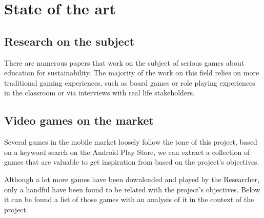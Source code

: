 \chapter{State of the art}

\section{Research on the subject}

There are numerous papers 
\cite{gamingnaturalresource}
\cite{roleplayingasatool}
\cite{usingsimulation}
that work on the subject of serious games about education for sustainability. The majority of the work on this field relies on more traditional gaming experiences, such as board games or role playing experiences in the classroom or via interviews with real life stakeholders.

\section{Video games on the market}

Several games in the mobile market loosely follow the tone of this project, based on a keyword search on the Android Play Store, we can extract a collection of games that are valuable to get inspiration from based on the project's objectives.

Although a lot more games have been downloaded and played by the Researcher, only a handful have been found to be related with the project's objectives. Below it can be found a list of those games with an analysis of it in the context of the project.

